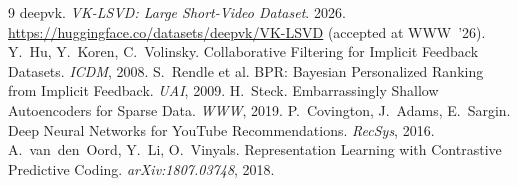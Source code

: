 \documentclass[11pt,a4paper]{article}
\begin{document}
\begin{thebibliography}{9}
 deepvk. \emph{VK-LSVD: Large Short-Video Dataset}. 2026.
  \url{https://huggingface.co/datasets/deepvk/VK-LSVD} (accepted at WWW~'26).
 Y.~Hu, Y.~Koren, C.~Volinsky. Collaborative Filtering for Implicit
  Feedback Datasets. \emph{ICDM}, 2008.
 S.~Rendle et al. BPR: Bayesian Personalized Ranking from Implicit
  Feedback. \emph{UAI}, 2009.
 H.~Steck. Embarrassingly Shallow Autoencoders for Sparse Data.
  \emph{WWW}, 2019.
 P.~Covington, J.~Adams, E.~Sargin. Deep Neural Networks for
  YouTube Recommendations. \emph{RecSys}, 2016.
 A.~van~den~Oord, Y.~Li, O.~Vinyals. Representation Learning with
  Contrastive Predictive Coding. \emph{arXiv:1807.03748}, 2018.
\end{thebibliography}
\end{document}

